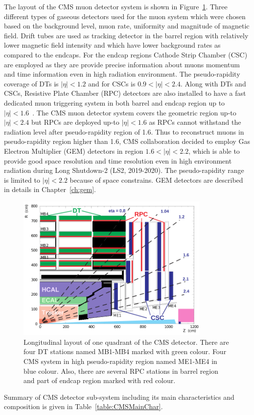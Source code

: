 The layout of the CMS muon detector system is shown in Figure~\ref{fig:muon-system-layout}. Three different types of gaseous detectors used for the muon system which were chosen based on the background level, muon rate, uniformity and magnitude of magnetic field. Drift tubes are used as tracking detector in the barrel region with relatively lower magnetic field intensity and which have lower background rates as compared to the endcaps. 
For the endcap regions Cathode Strip Chamber (CSC) are employed as they are provide precise information about muons momentum and time information even in high radiation environment. The pseudo-rapidity coverage of DTs is $|\eta|<1.2$ and for CSCs is $0.9<|\eta|<2.4$. Along with DTs and CSCs, Resistive Plate Chamber (RPC) detectors are also installed to have a fast dedicated  muon triggering system in both barrel and endcap region up to $|\eta|<1.6$~\cite{muon-tdr}. The CMS muon detector system covers the geometric region up-to $|\eta|<2.4$ but RPCs are deployed up-to $|\eta|<1.6$ as RPCs cannot withstand the radiation level after pseudo-rapidity region of 1.6. Thus to reconstruct muons in pseudo-rapidity region higher than 1.6, CMS collaboration decided to employ Gas Electron Multiplier (GEM) detectors in region  $1.6<|\eta|<2.2$, which is able to provide good space resolution and time resolution even in high environment radiation during Long Shutdown-2 (LS2, 2019-2020). The pseudo-rapidity range is limited to $|\eta|<2.2$ because of space constrains. GEM  detectors are described in details in Chapter~\ref{ch:gem}.
\begin{figure}[!htbp]
	\vspace{-3.2em}
	\centering
	\includegraphics[width=0.85\textwidth]{figures/LHC/pictures_MuonSys-mod3.png}
	\caption{Longitudinal layout of one quadrant of the CMS detector. There are four DT stations named MB1-MB4 marked with green colour. Four CMS system in high pseudo-rapidity region named ME1-ME4 in blue colour. Also, there are several RPC stations in barrel region and part of endcap region marked with red colour.}
	\label{fig:muon-system-layout}
\end{figure}
Summary of CMS detector sub-system including its main characteristics and composition is given in Table~\ref{table:CMSMainChar}.

